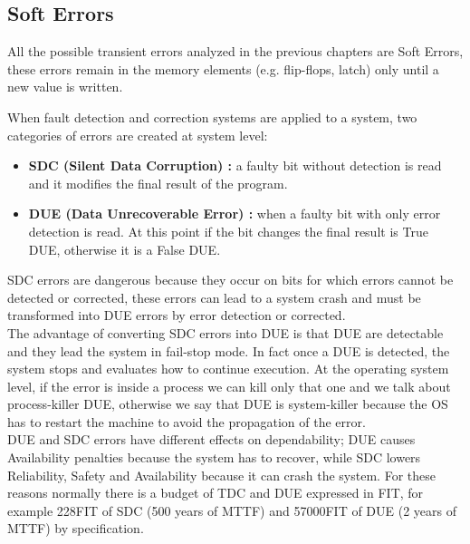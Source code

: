 {{{{{				} %
			}%
		}%
			
		\newpage
		\subsection{Soft Errors}{
			All the possible transient errors analyzed in the previous chapters are Soft Errors, these errors remain in the memory elements (e.g. flip-flops, latch) only until a new value is written.
			
			
			When fault detection and correction systems are applied to a system, two categories of errors are created at system level:
			\begin{itemize}
				\item \textbf{SDC (Silent Data Corruption) :} a faulty bit without detection is read and it modifies the final result of the program.
				\item \textbf{DUE (Data Unrecoverable Error) :} when a faulty bit with only error detection is read. At this point if the bit changes the final result is True DUE, otherwise it is a False DUE.   
			\end{itemize}
			SDC errors are dangerous because they occur on bits for which errors cannot be detected or corrected, these errors can lead to a system crash and must be transformed into DUE errors by error detection or corrected. \\
			
			The advantage of converting SDC errors into DUE is that DUE are detectable  and they lead the system in fail-stop mode. In fact once a DUE is detected, the system stops and evaluates how to continue execution. At the operating system level, if the error is inside a process we can kill only that one and we talk about process-killer DUE, otherwise we say that DUE is system-killer because the OS has to restart the machine to avoid the propagation of the error.\\
			
			DUE and SDC errors have different effects on dependability; DUE causes Availability penalties because the system has to recover, while SDC lowers Reliability, Safety and Availability because it can crash the system. 
			For these reasons normally there is a budget of TDC and DUE expressed in FIT, for example  228FIT of SDC (500 years of MTTF) and 57000FIT of DUE (2 years of MTTF) by specification.   
}}}
